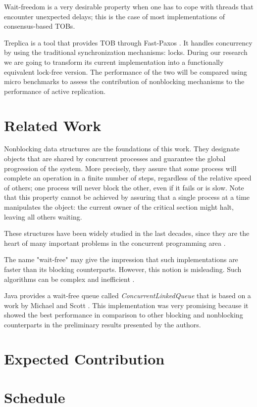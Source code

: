 \documentclass[12pt,twoside,a4paper]{article}
\begin{document}
Wait-freedom is a very  desirable property when one has to cope with threads
that encounter unexpected delays; this  is the case
of  most  implementations of  consensus-based  TOBs.

Treplica \cite{vieira2008} is a tool that provides TOB through Fast-Paxos
\cite{Lamport2006}. It handles concurrency by using the traditional
synchronization mechanisms: locks. During our research we are going to transform
its current implementation  into a functionally equivalent lock-free version.
The  performance of the two will be compared using micro benchmarks to assess
the contribution  of nonblocking mechanisms to the  performance of active
replication.


\section{Related Work}
\label{sec:related}

Nonblocking data structures are the foundations of this work. They designate
objects that are shared by concurrent processes and guarantee the global
progression of the system. More precisely, they  assure that some process will
complete an operation in a finite number of steps, regardless of the relative
speed of others; one process will never block the other, even if it fails or is
slow. Note that this  property cannot be achieved by assuring that a single
process at a time manipulates the object: the current owner of the critical
section might halt, leaving all others waiting.

These structures have been widely studied in the last decades, since they are
the heart of many important problems in the concurrent programming area
\cite{herlihy2011art}.

The name "wait-free" may give the impression that such implementations are
faster than its blocking counterparts. However, this notion is misleading.  Such
algorithms can be complex and inefficient \cite{attiya1994wait}.

Java provides a wait-free queue called \textit{ConcurrentLinkedQueue} that is
based on a work by Michael and Scott \cite{michael1996simple}. This
implementation was very promising because it showed the best performance in
comparison to other blocking and nonblocking counterparts in the preliminary
results presented by the authors.


\section{Expected Contribution}
\label{sec:contrib}



\section{Schedule}
\label{sec:schedule}


\vskip 15mm

{}

\end{document}
